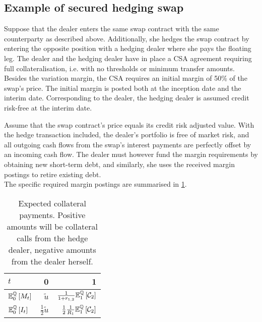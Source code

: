\documentclass[main.tex]{subfiles}
\begin{document}
    \subsection{Example of secured hedging swap}
        Suppose that the dealer enters the same swap contract with the same counterparty as described above.
        Additionally, she hedges the swap contract by entering the opposite position with a hedging dealer
        where she pays the floating leg.
        The dealer and the hedging dealer have in place a CSA agreement 
        requiring full collateralisation, i.e. with no thresholds or minimum transfer amounts.
        Besides the variation margin,
        the CSA requires an initial margin of 50\% of the swap's price.
        The initial margin is posted both at the inception date and the interim date.
        Corresponding to the dealer, the hedging dealer is assumed credit risk-free at the interim date.

        Assume that the swap contract's price equals its credit risk adjusted value.
        With the hedge transaction included,
        the dealer's portfolio is free of market risk,
        and all outgoing cash flows from the swap's interest payments
        are perfectly offset by an incoming cash flow.
        The dealer must however fund the margin requirements by obtaining new short-term debt,
        and similarly, she uses the received margin postings to retire existing debt.
        \\
        The specific required margin postings are summarised in \cref{tbl:swap-margin-postings}.

        \begin{table}[H]
            \centering
            \begin{tabular}{l|rr}
                $t$ & 0 & 1 \\
                \hline
                \rule{0pt}{1.3em}
                $\mathbb{E}_{0}^{\mathbb{Q}}\left[M_t\right]$ & $\tilde{u}$ & $\frac{1}{1+r_{1,2}}\mathbb{E}_{1}^{\mathbb{Q}}\left[\mathcal{C}_{2}\right]$ \\
                \rule{0pt}{1.3em}
                $\mathbb{E}_{0}^{\mathbb{Q}}\left[I_t\right]$ & $\frac{1}{2}\tilde{u}$ & $\frac{1}{2}\frac{1}{R_1}\mathbb{E}_{1}^{\mathbb{Q}}\left[\mathcal{C}_{2}\right]$ \\
            \end{tabular}
            \caption{
                Expected collateral payments. 
                Positive amounts will be collateral calls from the hedge dealer,
                negative amounts from the dealer herself.
            }
            \label{tbl:swap-margin-postings}
        \end{table}
\end{document}
